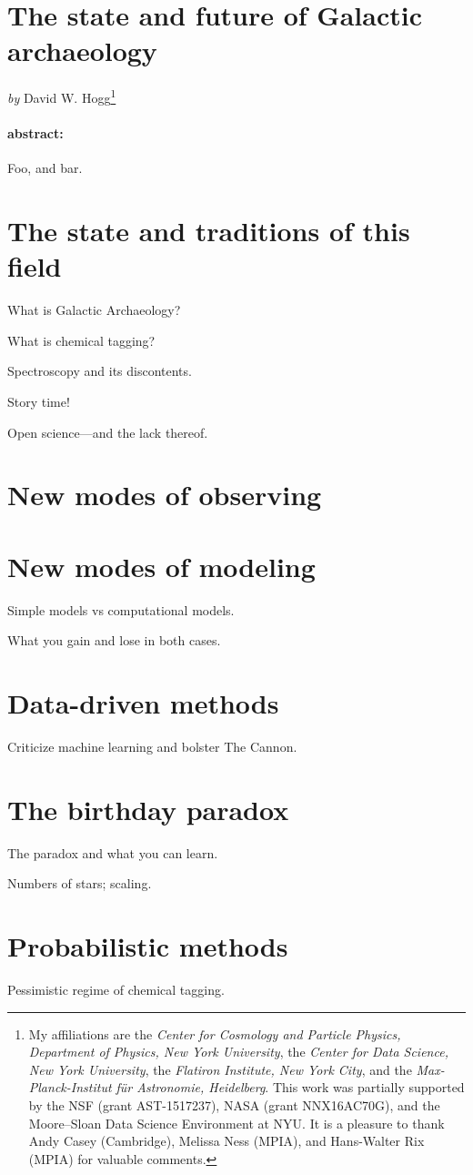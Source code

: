 \documentclass[11pt, letterpaper]{article}
\begin{document}
\section*{The state and future of Galactic archaeology}

\noindent
\textit{by} {David W. Hogg}\footnote{My affiliations are the
  \textsl{Center for Cosmology and Particle Physics, Department of
    Physics, New York University}, the \textsl{Center for Data
    Science, New York University}, the \textsl{Flatiron Institute, New
    York City}, and the \textsl{Max-Planck-Institut f\"ur Astronomie,
    Heidelberg}. This work was partially supported by the NSF (grant
  AST-1517237), NASA (grant NNX16AC70G), and the Moore--Sloan Data
  Science Environment at NYU. It is a pleasure to thank Andy Casey
  (Cambridge), Melissa Ness (MPIA), and Hans-Walter Rix (MPIA) for
  valuable comments.}

\paragraph{abstract:}
Foo, and bar.

\section{The state and traditions of this field}

What is Galactic Archaeology?

What is chemical tagging?

Spectroscopy and its discontents.

Story time!

Open science---and the lack thereof.

\section{New modes of observing}

\section{New modes of modeling}

Simple models vs computational models.

What you gain and lose in both cases.

\section{Data-driven methods}

Criticize machine learning and bolster The Cannon.

\section{The birthday paradox}

The paradox and what you can learn.

Numbers of stars; scaling.

\section{Probabilistic methods}

Pessimistic regime of chemical tagging.
\end{document}
